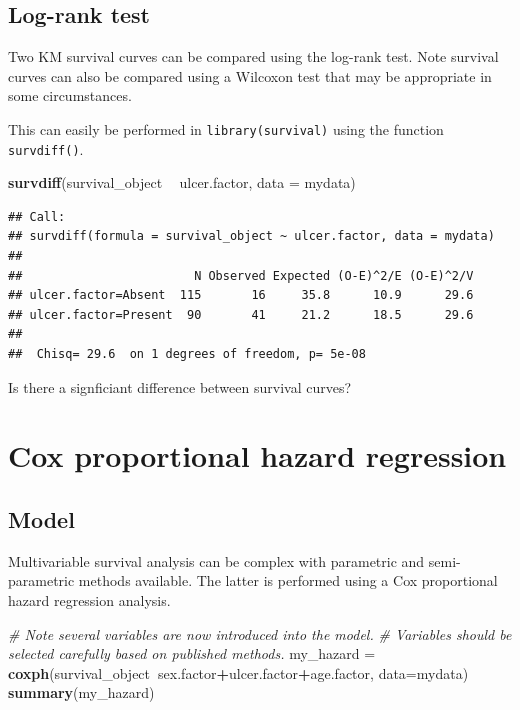 \documentclass[]{book}
\makeatletter
\newenvironment{Shaded}{\begin{snugshade}}{\end{snugshade}}
\newcommand{\CommentTok}[1]{\textcolor[rgb]{0.56,0.35,0.01}{\textit{#1}}}
\newcommand{\DataTypeTok}[1]{\textcolor[rgb]{0.13,0.29,0.53}{#1}}
\newcommand{\KeywordTok}[1]{\textcolor[rgb]{0.13,0.29,0.53}{\textbf{#1}}}
\newcommand{\NormalTok}[1]{#1}
\newcommand{\OperatorTok}[1]{\textcolor[rgb]{0.81,0.36,0.00}{\textbf{#1}}}
\newcommand{\StringTok}[1]{\textcolor[rgb]{0.31,0.60,0.02}{#1}}
\newenvironment{kframe}{%
\medskip{}
\setlength{\fboxsep}{.8em}
 \def\at@end@of@kframe{}%
 \ifinner\ifhmode%
  \def\at@end@of@kframe{\end{minipage}}%
  \begin{minipage}{\columnwidth}%
 \fi\fi%
 \def\FrameCommand##1{\hskip\@totalleftmargin \hskip-\fboxsep
 \colorbox{shadecolor}{##1}\hskip-\fboxsep
     \hskip-\linewidth \hskip-\@totalleftmargin \hskip\columnwidth}%
 \MakeFramed {\advance\hsize-\width
   \@totalleftmargin\z@ \linewidth\hsize
   \@setminipage}}%
 {\par\unskip\endMakeFramed%
 \at@end@of@kframe}
\renewenvironment{Shaded}{\begin{kframe}}{\end{kframe}}
\theoremstyle{definition}
\theoremstyle{definition}
\theoremstyle{definition}
\theoremstyle{remark}
\makeatother
\begin{document}
\hypertarget{log-rank-test}{%
\subsection{Log-rank test}\label{log-rank-test}}

Two KM survival curves can be compared using the log-rank test. Note
survival curves can also be compared using a Wilcoxon test that may be
appropriate in some circumstances.

This can easily be performed in \texttt{library(survival)} using the
function \texttt{survdiff()}.

\begin{Shaded}
\begin{Highlighting}[]
\KeywordTok{survdiff}\NormalTok{(survival_object }\OperatorTok{~}\StringTok{ }\NormalTok{ulcer.factor, }\DataTypeTok{data =}\NormalTok{ mydata)}
\end{Highlighting}
\end{Shaded}

\begin{verbatim}
## Call:
## survdiff(formula = survival_object ~ ulcer.factor, data = mydata)
## 
##                        N Observed Expected (O-E)^2/E (O-E)^2/V
## ulcer.factor=Absent  115       16     35.8      10.9      29.6
## ulcer.factor=Present  90       41     21.2      18.5      29.6
## 
##  Chisq= 29.6  on 1 degrees of freedom, p= 5e-08
\end{verbatim}

Is there a signficiant difference between survival curves?

\hypertarget{cox-proportional-hazard-regression}{%
\section{Cox proportional hazard
regression}\label{cox-proportional-hazard-regression}}

\hypertarget{model-1}{%
\subsection{Model}\label{model-1}}

Multivariable survival analysis can be complex with parametric and
semi-parametric methods available. The latter is performed using a Cox
proportional hazard regression analysis.

\begin{Shaded}
\begin{Highlighting}[]
\CommentTok{# Note several variables are now introduced into the model. }
\CommentTok{# Variables should be selected carefully based on published methods.  }
\NormalTok{my_hazard =}\StringTok{ }\KeywordTok{coxph}\NormalTok{(survival_object}\OperatorTok{~}\NormalTok{sex.factor}\OperatorTok{+}\NormalTok{ulcer.factor}\OperatorTok{+}\NormalTok{age.factor, }\DataTypeTok{data=}\NormalTok{mydata)}
\KeywordTok{summary}\NormalTok{(my_hazard)}
\end{Highlighting}
\end{Shaded}
\end{document}
